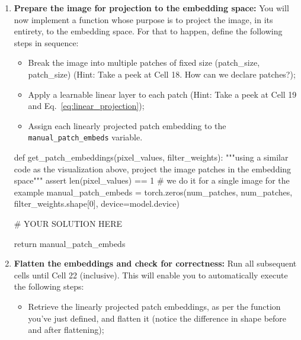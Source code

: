 \begin{exercise}
\begin{enumerate}
\begin{itemize}
        \item Load a tokenizer and tokenize the previously defined image labels;

        \item Embed the image labels and visualize the outcome of splitting the example image into fixed size patches;

        \item Store the learned weights for linearly projecting the image.
    \end{itemize}

    \item \textbf{Prepare the image for projection to the embedding space:} You will now implement a function whose purpose is to project the image, in its entirety, to the embedding space. For that to happen, define the following steps in sequence:
    \begin{itemize}
        \item Break the image into multiple patches of fixed size (patch\_size, patch\_size) (Hint: Take a peek at Cell 18. How can we declare patches?);

        \item Apply a learnable linear layer to each patch (Hint: Take a peek at Cell 19 and Eq.~\ref{eq:linear_projection});

        \item Assign each linearly projected patch embedding to the \texttt{manual\_patch\_embeds} variable.
    \end{itemize}
    \begin{python}
def get_patch_embeddings(pixel_values, filter_weights):
"""using a similar code as the visualization above, project the image patches in the embedding space"""
    assert len(pixel_values) == 1 # we do it for a single image for the example
    manual_patch_embeds = torch.zeros(num_patches, num_patches, filter_weights.shape[0], device=model.device)
    
    # YOUR SOLUTION HERE
    
    return manual_patch_embeds
    \end{python}

    \item \textbf{Flatten the embeddings and check for correctness:} Run all subsequent cells until Cell 22 (inclusive). This will enable you to automatically execute the following steps:
    \begin{itemize}
        \item Retrieve the linearly projected patch embeddings, as per the function you've just defined, and flatten it (notice the difference in shape before and after flattening);


\end{itemize}
\end{enumerate}
\end{exercise}
